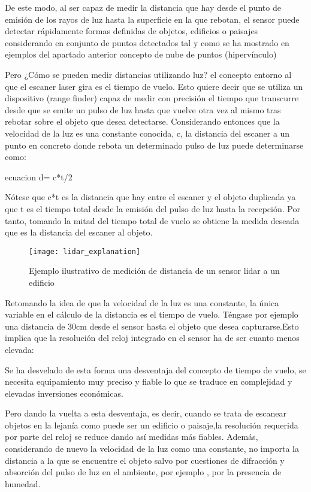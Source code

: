 De este modo, al ser capaz de medir la distancia que hay desde el punto de emisión de los rayos de luz hasta la superficie en la que rebotan, el sensor puede detectar rápidamente formas definidas de objetos, edificios o paisajes considerando en conjunto de puntos detectados tal y como se ha mostrado en ejemplos del apartado anterior concepto de nube de puntos (hipervínculo)

Pero ¿Cómo se pueden medir distancias utilizando luz? el concepto entorno al que el escaner laser gira es el tiempo de vuelo. Esto quiere decir que se utiliza un dispositivo (range finder) capaz de medir con precisión el tiempo que transcurre desde que se emite un pulso de luz hasta que vuelve otra vez al mismo tras rebotar sobre el objeto que desea detectarse. Considerando entonces que la velocidad de la luz es una constante conocida, c, la distancia del escaner a un punto en concreto donde rebota un determinado pulso de luz puede determinarse como:

ecuacion d= c*t/2

Nótese que c*t es la distancia que hay entre el escaner y el objeto duplicada ya que t es el tiempo total desde la emisión del pulso de luz hasta la recepción. Por tanto, tomando la mitad del tiempo total de vuelo se obtiene la medida deseada que es la distancia del escaner al objeto.

\begin{figure}
\centering
{}
  \texttt{[image: lidar\_explanation]}
  \caption{Ejemplo ilustrativo de medición de distancia de un sensor lidar a un edificio}\label{fig:lidar explanation}
\endminipage\hfill

\end{figure}


Retomando la idea de que la velocidad de la luz es una constante, la única variable en el cálculo de la distancia es el tiempo de vuelo. Téngase por ejemplo una distancia de 30cm desde el sensor hasta el objeto que desea capturarse.Esto implica que la resolución del reloj integrado en el sensor ha de ser cuanto menos elevada:


Se ha desvelado de esta forma una desventaja del concepto de tiempo de vuelo, se necesita equipamiento muy preciso y fiable lo que se traduce en complejidad y elevadas inversiones económicas.

Pero dando la vuelta a esta desventaja, es decir, cuando se trata de escanear objetos en la lejanía como puede ser un edificio o paisaje,la resolución requerida por parte del reloj se reduce dando así medidas más fiables. Además, considerando de nuevo la velocidad de la luz como una constante, no importa la distancia a la que se encuentre el objeto salvo por cuestiones de difracción y absorción del pulso de luz en el ambiente, por ejemplo , por la presencia de humedad.


